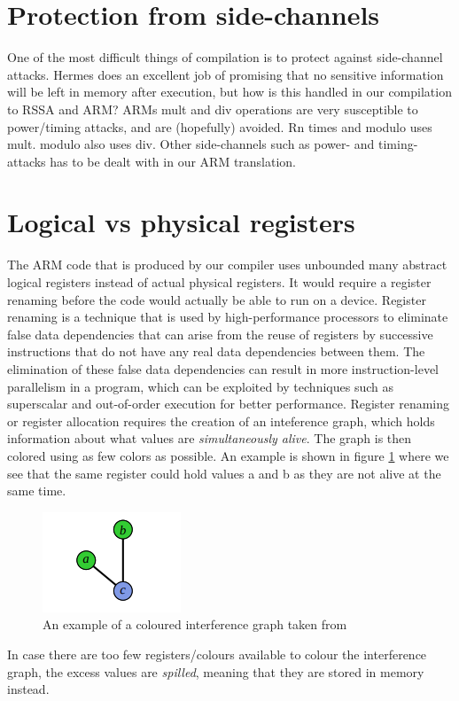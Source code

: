 \section{Protection from side-channels}
One of the most difficult things of compilation is to protect against side-channel attacks. Hermes does an excellent job of promising that no sensitive information will be left in memory after execution, but how is this handled in our compilation to RSSA and ARM? %
ARMs mult and div operations are very susceptible to power/timing attacks, and are (hopefully) avoided. Rn times and modulo uses mult. modulo also uses div. 
Other side-channels such as power- and timing-attacks has to be dealt with in our ARM translation. %


\section{Logical vs physical registers}
The ARM code that is produced by our compiler uses unbounded many abstract logical registers instead of actual physical registers.
It would require a register renaming before the code would actually be able to run on a device.
Register renaming is a technique that is used by high-performance processors to eliminate false data dependencies that can arise from the reuse of registers by successive instructions that do not have any real data dependencies between them.
The elimination of these false data dependencies can result in more instruction-level parallelism in a program, which can be exploited by techniques such as superscalar and out-of-order execution for better performance.
Register renaming or register allocation requires the creation of an inteference graph, which holds information about what values are \emph{simultaneously alive}. The graph is then colored using as few colors as possible. An example is shown in figure \ref{fig:interferencegraph} where we see that the same register could hold values a and b as they are not alive at the same time.

\begin{figure}[ht]
  \centering
  \includegraphics[scale=0.5]{Graphics/interferencegraph.png}
  \caption{An example of a coloured interference graph taken from \cite{ITU_liveness} }
  \label{fig:interferencegraph}
\end{figure}

In case there are too few registers/colours available to colour the interference graph, the excess values are \emph{spilled}, meaning that they are stored in memory instead.
